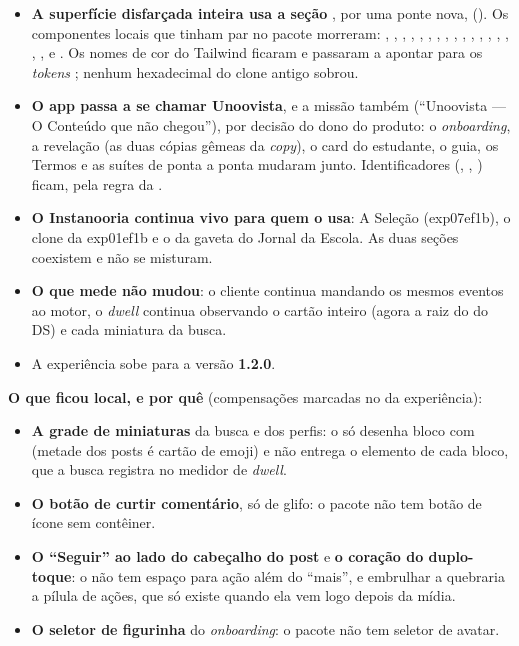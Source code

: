 \begin{itemize}
  \item \textbf{A superfície disfarçada inteira usa a seção }, por
    uma ponte nova, 
    (). Os componentes locais que tinham par no pacote
    morreram: , , , ,
    , , , ,
    , , , ,
    , , , , ,
     e . Os nomes de cor do Tailwind ficaram e passaram a
    apontar para os \emph{tokens} ; nenhum hexadecimal do clone
    antigo sobrou.
  \item \textbf{O app passa a se chamar Unoovista}, e a missão também
    (\enquote{Unoovista --- O Conteúdo que não chegou}), por decisão do dono do
    produto: o \emph{onboarding}, a revelação (as duas cópias gêmeas da
    \emph{copy}), o card do estudante, o guia, os Termos e as suítes de ponta a
    ponta mudaram junto. Identificadores (,
    , ) ficam, pela regra da
    .
  \item \textbf{O Instanooria continua vivo para quem o usa}: A Seleção
    (exp07ef1b), o clone da exp01ef1b e o  da gaveta do Jornal da
    Escola. As duas seções coexistem e não se misturam.
  \item \textbf{O que mede não mudou}: o cliente continua mandando os mesmos
    eventos ao motor, o \emph{dwell} continua observando o cartão inteiro
    (agora a raiz do  do DS) e cada miniatura da busca.
  \item A experiência sobe para a versão \textbf{1.2.0}.
\end{itemize}

\textbf{O que ficou local, e por quê} (compensações marcadas no
 da experiência):

\begin{itemize}
  \item \textbf{A grade de miniaturas} da busca e dos perfis: o
     só desenha bloco com  (metade dos posts é cartão de
    emoji) e não entrega o elemento de cada bloco, que a busca registra no
    medidor de \emph{dwell}.
  \item \textbf{O botão de curtir comentário}, só de glifo: o pacote não tem
    botão de ícone sem contêiner.
  \item \textbf{O \enquote{Seguir} ao lado do cabeçalho do post} e \textbf{o
    coração do duplo-toque}: o  não tem espaço para ação
    além do \enquote{mais}, e embrulhar a  quebraria a pílula
    de ações, que só existe quando ela vem logo depois da mídia.
  \item \textbf{O seletor de figurinha} do \emph{onboarding}: o pacote não
    tem seletor de avatar.
\end{itemize}

